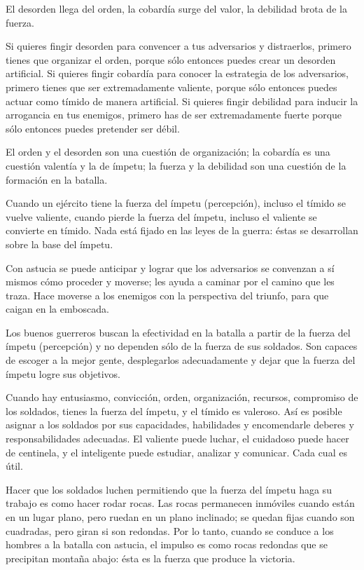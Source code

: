 El desorden llega del orden, la cobardía surge del valor, la debilidad brota de la fuerza.

Si quieres fingir desorden para convencer a tus adversarios y distraerlos, primero tienes que organizar el orden, porque sólo entonces puedes crear un desorden artificial. Si quieres fingir cobardía para conocer la estrategia de los adversarios, primero tienes que ser extremadamente valiente, porque sólo entonces puedes actuar como tímido de manera artificial. Si quieres fingir debilidad para inducir la arrogancia en tus enemigos, primero has de ser extremadamente fuerte porque sólo entonces puedes pretender ser débil.

El orden y el desorden son una cuestión de organización; la cobardía es una cuestión valentía y la de ímpetu; la fuerza y la debilidad son una cuestión de la formación en la batalla.

Cuando un ejército tiene la fuerza del ímpetu (percepción), incluso el tímido se vuelve valiente, cuando pierde la fuerza del ímpetu, incluso el valiente se convierte en tímido. Nada está fijado en las leyes de la guerra: éstas se desarrollan sobre la base del ímpetu.

Con astucia se puede anticipar y lograr que los adversarios se convenzan a sí mismos cómo proceder y moverse; les ayuda a caminar por el camino que les traza. Hace moverse a los enemigos con la perspectiva del triunfo, para que caigan en la emboscada.

Los buenos guerreros buscan la efectividad en la batalla a partir de la fuerza del ímpetu (percepción) y no dependen sólo de la fuerza de sus soldados. Son capaces de escoger a la mejor gente, desplegarlos adecuadamente y dejar que la fuerza del ímpetu logre sus objetivos.

Cuando hay entusiasmo, convicción, orden, organización, recursos, compromiso de los soldados, tienes la fuerza del ímpetu, y el tímido es valeroso. Así es posible asignar a los soldados por sus capacidades, habilidades y encomendarle deberes y responsabilidades adecuadas. El valiente puede luchar, el cuidadoso puede hacer de centinela, y el inteligente puede estudiar, analizar y comunicar. Cada cual es útil.

Hacer que los soldados luchen permitiendo que la fuerza del ímpetu haga su trabajo es como hacer rodar rocas. Las rocas permanecen inmóviles cuando están en un lugar plano, pero ruedan en un plano inclinado; se quedan fijas cuando son cuadradas, pero giran si son redondas. Por lo tanto, cuando se conduce a los hombres a la batalla con astucia, el impulso es como rocas redondas que se precipitan montaña abajo: ésta es la fuerza que produce la victoria. 
